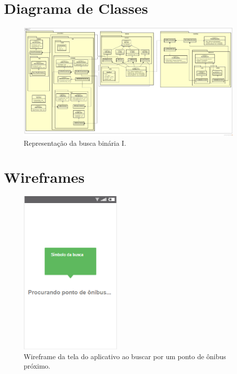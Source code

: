 \documentclass[
	12pt,				%
	oneside,			%
	a4paper,			%
	brazil				%
]{abntex2}
\begin{document}
{

\begin{apendicesenv}
\partapendices

\chapter{Diagrama de Classes}

\begin{figure}[H]
\centering
\includegraphics[angle=90, width=12cm, center]{images/app-class-diagram}
\caption{Representação da busca binária I.}
\label{Rotulo}
\end{figure}

\chapter{Wireframes}

\begin{figure}[!h]
\centering
\includegraphics[width=5cm, center]{images/tela-1-buscando-beacon.PNG}
\caption{Wireframe da tela do aplicativo ao buscar por um ponto de ônibus próximo.}
\label{Rotulo}
\end{figure}


\end{apendicesenv}}
\end{document}
